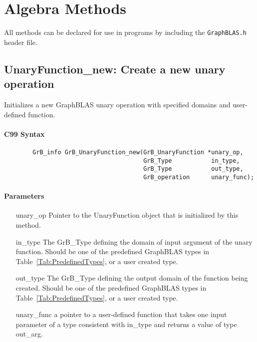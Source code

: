 \section{Algebra Methods}

All methods can be declared for use in programs by including the {\tt GraphBLAS.h} header file.


\subsection{{\sf UnaryFunction\_new}: Create a new unary operation}

Initializes a new GraphBLAS unary operation with specified domains and user-defined function.


\paragraph{C99 Syntax}

\begin{verbatim}
        GrB_info GrB_UnaryFunction_new(GrB_UnaryFunction *unary_op,
                                       GrB_Type           in_type,
                                       GrB_Type           out_type,
                                       GrB_operation      unary_func);
\end{verbatim}

\paragraph{Parameters}

\begin{itemize}[leftmargin=1.1in]
    \item[{\sf unary\_op}]      Pointer to the UnaryFunction object that is initialized by 
    this method.
    \item[{\sf in\_type}]        The {\sf GrB\_Type} defining the domain of input argument of
    the unary function. Should be one of the predefined
    GraphBLAS types in Table~\ref{Tab:PredefinedTypes}, or a user created type.
    \item[{\sf out\_type}]       The {\sf GrB\_Type} defining the output domain of the function
    being created.  Should be one of the predefined
    GraphBLAS types in Table~\ref{Tab:PredefinedTypes}, or a user created type.
    \item[{\sf unary\_func}]     a pointer to a user-defined function that takes one input 
    parameter of a type consistent with {\sf in\_type} and returns a value of type {\sf out\_arg}.
\end{itemize}


